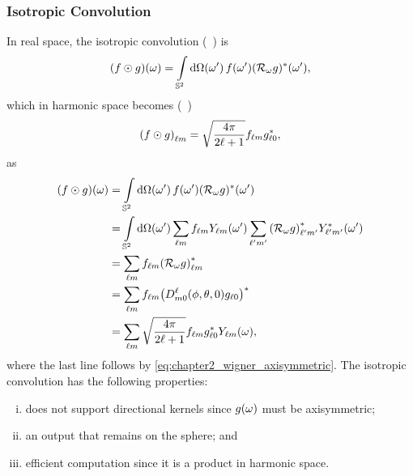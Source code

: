 \subsubsection{Isotropic Convolution}

In real space, the isotropic convolution (\eg{}~\cite{McEwen2007,Wei2011,Kennedy2011}) is
%
\begin{equation}
    \pixel{(f \odot g)}
    = \integrateSphere{\omega'} \pixel[']{f} \pixel[']{\conj{(\rotation{\omega}g)}},
\end{equation}
%
which in harmonic space becomes (\eg{}~\cite{McEwen2007})
%
\begin{equation}\label{eq:chapter3_isotropic_harmonic}
    \harmonic{(f \odot g)}
    = \sqrt{\inverseFactor} \harmonic{f} \conj{\axiHarmonic{g}},
\end{equation}
%
as
%
\begin{align}
    \pixel{(f \odot g)}
     & = \integrateSphere{\omega'} \pixel[']{f} \pixel[']{\conj{(\rotation{\omega}g)}} \nonumber{}                                                                                           \\
     & = \integrateSphere{\omega'} \harmonicSum \harmonic{f} \pixel[']{\harmonic{Y}} \harmonicSum['] \conj{\harmonic[']{(\rotation{\omega}g)}} \pixel[']{\conj{\harmonic[']{Y}}} \nonumber{} \\
     & = \harmonicSum \harmonic{f} \conj{\harmonic{(\rotation{\omega}g)}} \nonumber                                                                                                          \\
     & = \harmonicSum \harmonic{f} \conj{\big(\wigner{\ell}{m}{0}(\phi,\theta,0) \axiHarmonic{g}\big)} \nonumber{}                                                                           \\
     & = \harmonicSum \sqrt{\inverseFactor} \harmonic{f} \conj{\axiHarmonic{g}} \pixel{\harmonic{Y}},
\end{align}
%
where the last line follows by \cref{eq:chapter2_wigner_axisymmetric}.
The isotropic convolution has the following properties:
%
\begin{enumerate}[(i),nosep,left=\parindent]
    \item does not support directional kernels since \(\pixel{g}\) must be axisymmetric;
    \item an output that remains on the sphere; and
    \item efficient computation since it is a product in harmonic space.
\end{enumerate}

